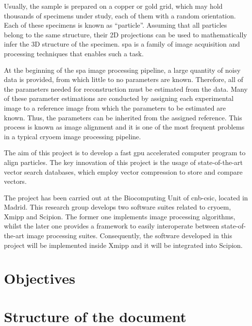 \documentclass[../main.tex]{subfiles}
\begin{document}
Usually, the sample is prepared on a copper or gold grid, which may hold thousands of specimens under study, each of them with a random orientation. Each of these specimens is known as ``particle''. Assuming that all particles belong to the same structure, their 2D projections can be used to mathematically infer the 3D structure of the specimen\cite{cryoem101}. \Gls{spa} is a family of image acquisition and processing techniques that enables such a task.

At the beginning of the \gls{spa} image processing pipeline, a large quantity of noisy data is provided, from which little to no parameters are known. Therefore, all of the parameters needed for reconstruction must be estimated from the data. Many of these parameter estimations are conducted by assigning each experimental image to a reference image from which the parameters to be estimated are known. Thus, the parameters can be inherited from the assigned reference. This process is known as image alignment and it is one of the most frequent problems in a typical \gls{cryoem} image processing pipeline.

The aim of this project is to develop a fast \gls{gpu} accelerated computer program to align particles. The key innovation of this project is the usage of state-of-the-art vector search databases, which employ vector compression to store and compare vectors. 

The project has been carried out at the Biocomputing Unit of \gls{cnb}-\gls{csic}, located in Madrid. This research group develops two software suites related to \gls{cryoem}, Xmipp and Scipion. The former one implements image processing algorithms, whilst the later one provides a framework to easily interoperate between state-of-the-art image processing suites. Consequently, the software developed in this project will be implemented inside Xmipp and it will be integrated into Scipion.

\section{Objectives}


\section{Structure of the document}

\end{document}
